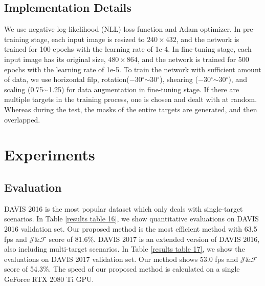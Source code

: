 \documentclass{article}
\begin{document}
\subsection{Implementation Details}
We use negative log-likelihood (NLL) loss function and Adam optimizer. In pre-training stage, each input image is resized to $240\times432$, and the network is trained for 100 epochs with the learning rate of 1e-4. In fine-tuning stage, each input image has its original size, $480\times864$, and the network is trained for 500 epochs with the learning rate of 1e-5. To train the network with sufficient amount of data, we use horizontal filp, rotation($-$30$^\circ$$\sim$30$^\circ$), shearing ($-$30$^\circ$$\sim$30$^\circ$), and scaling (0.75$\sim$1.25) for data augmentation in fine-tuning stage. If there are multiple targets in the training process, one is chosen and dealt with at random. Whereas during the test, the masks of the entire targets are generated, and then overlapped.



\section{Experiments}
\subsection{Evaluation}
DAVIS 2016 \cite{perazzi2016benchmark} is the most popular dataset which only deals with single-target scenarios. In Table \ref{results table 16}, we show quantitative evaluations on DAVIS 2016 validation set. Our proposed method is the most efficient method with 63.5 fps and $\mathcal{J}\&\mathcal{F}$ score of 81.6\%. DAVIS 2017 \cite{pont20172017} is an extended version of DAVIS 2016, also including multi-target scenarios. In Table \ref{results table 17}, we show the evaluations on DAVIS 2017 validation set. Our method shows 53.0 fps and $\mathcal{J}\&\mathcal{F}$ score of 54.3\%. The speed of our proposed method is calculated on a single GeForce RTX 2080 Ti GPU. 
\end{document}
